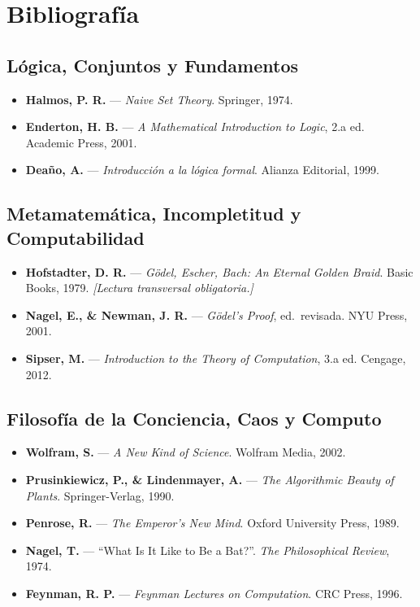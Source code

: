 \documentclass[11pt, letterpaper]{article}
\begin{document}
\newpage

\section{Bibliografía}

\subsection*{L\'ogica, Conjuntos y Fundamentos}
\begin{itemize}
  \item \textbf{Halmos, P. R.} --- \emph{Naive Set Theory}. Springer, 1974.
  \item \textbf{Enderton, H. B.} --- \emph{A Mathematical Introduction to Logic}, 2.a ed. Academic Press, 2001.
  \item \textbf{Deaño, A.} --- \emph{Introducci\'on a la l\'ogica formal}. Alianza Editorial, 1999.
\end{itemize}

\subsection*{Metamatem\'atica, Incompletitud y Computabilidad}
\begin{itemize}
  \item \textbf{Hofstadter, D. R.} --- \emph{G\"odel, Escher, Bach: An Eternal Golden Braid}. Basic Books, 1979. \textit{[Lectura transversal obligatoria.]}
  \item \textbf{Nagel, E., \& Newman, J. R.} --- \emph{G\"odel's Proof}, ed.\ revisada. NYU Press, 2001.
  \item \textbf{Sipser, M.} --- \emph{Introduction to the Theory of Computation}, 3.a ed. Cengage, 2012.
\end{itemize}

\subsection*{Filosof\'ia de la Conciencia, Caos y Computo}
\begin{itemize}
  \item \textbf{Wolfram, S.} --- \emph{A New Kind of Science}. Wolfram Media, 2002.
  \item \textbf{Prusinkiewicz, P., \& Lindenmayer, A.} --- \emph{The Algorithmic Beauty of Plants}. Springer-Verlag, 1990.
  \item \textbf{Penrose, R.} --- \emph{The Emperor's New Mind}. Oxford University Press, 1989.
  \item \textbf{Nagel, T.} --- ``What Is It Like to Be a Bat?''. \textit{The Philosophical Review}, 1974.
  \item \textbf{Feynman, R. P.} --- \emph{Feynman Lectures on Computation}. CRC Press, 1996.
\end{itemize}
\end{document}
